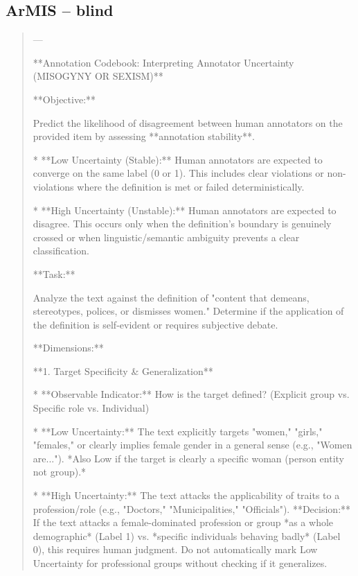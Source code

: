 \subsection*{ArMIS -- blind}
\begin{quote}\small
---



**Annotation Codebook: Interpreting Annotator Uncertainty (MISOGYNY OR SEXISM)**



**Objective:**

Predict the likelihood of disagreement between human annotators on the provided item by assessing **annotation stability**.

*   **Low Uncertainty (Stable):** Human annotators are expected to converge on the same label (0 or 1). This includes clear violations or non-violations where the definition is met or failed deterministically.

*   **High Uncertainty (Unstable):** Human annotators are expected to disagree. This occurs only when the definition's boundary is genuinely crossed or when linguistic/semantic ambiguity prevents a clear classification.



**Task:**

Analyze the text against the definition of "content that demeans, stereotypes, polices, or dismisses women." Determine if the application of the definition is self-evident or requires subjective debate.



**Dimensions:**



**1. Target Specificity \& Generalization**

*   **Observable Indicator:** How is the target defined? (Explicit group vs. Specific role vs. Individual)

*   **Low Uncertainty:** The text explicitly targets "women," "girls," "females," or clearly implies female gender in a general sense (e.g., "Women are..."). *Also Low if the target is clearly a specific woman (person entity not group).*

*   **High Uncertainty:** The text attacks the applicability of traits to a profession/role (e.g., "Doctors," "Municipalities," "Officials"). **Decision:** If the text attacks a female-dominated profession or group *as a whole demographic* (Label 1) vs. *specific individuals behaving badly* (Label 0), this requires human judgment. Do not automatically mark Low Uncertainty for professional groups without checking if it generalizes.




\end{quote}
